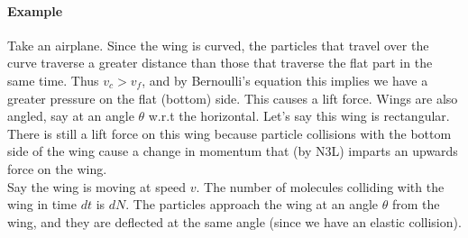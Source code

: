 \documentclass{report}
\numberwithin{equation}{section}
\begin{document}
\paragraph{Example} Take an airplane. Since the wing is curved, the particles that travel over the curve traverse a greater
distance than those that traverse the flat part in the same time. Thus $v_c > v_f$, and by Bernoulli's equation this implies we have a greater
pressure on the flat (bottom) side. This causes a lift force. Wings are also angled, say at an angle $\theta$ w.r.t the horizontal. Let's say this
wing is rectangular. There is still a lift force on this wing because particle collisions with the bottom side of the wing cause a change in
momentum that (by N3L) imparts an upwards force on the wing. \\

\noindent Say the wing is moving at speed $v$. The number of molecules colliding with the wing in time $dt$ is $dN$. The particles
approach the wing at an angle $\theta$ from the wing, and they are deflected at the same angle (since we have an elastic collision).
\end{document}
